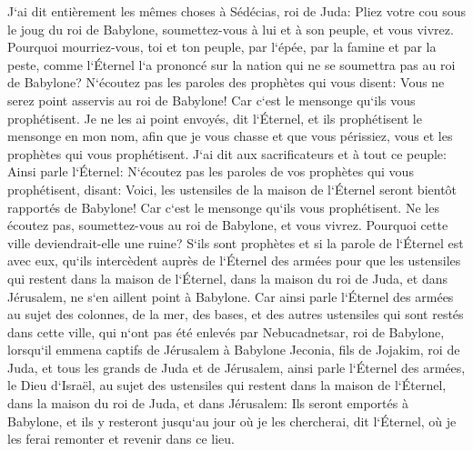 \verse J`ai dit entièrement les mêmes choses à Sédécias, roi de Juda: Pliez votre cou sous le joug du roi de Babylone, soumettez-vous à lui et à son peuple, et vous vivrez. 
\verse Pourquoi mourriez-vous, toi et ton peuple, par l`épée, par la famine et par la peste, comme l`Éternel l`a prononcé sur la nation qui ne se soumettra pas au roi de Babylone? 
\verse N`écoutez pas les paroles des prophètes qui vous disent: Vous ne serez point asservis au roi de Babylone! Car c`est le mensonge qu`ils vous prophétisent. 
\verse Je ne les ai point envoyés, dit l`Éternel, et ils prophétisent le mensonge en mon nom, afin que je vous chasse et que vous périssiez, vous et les prophètes qui vous prophétisent. 
\verse J`ai dit aux sacrificateurs et à tout ce peuple: Ainsi parle l`Éternel: N`écoutez pas les paroles de vos prophètes qui vous prophétisent, disant: Voici, les ustensiles de la maison de l`Éternel seront bientôt rapportés de Babylone! Car c`est le mensonge qu`ils vous prophétisent. 
\verse Ne les écoutez pas, soumettez-vous au roi de Babylone, et vous vivrez. Pourquoi cette ville deviendrait-elle une ruine? 
\verse S`ils sont prophètes et si la parole de l`Éternel est avec eux, qu`ils intercèdent auprès de l`Éternel des armées pour que les ustensiles qui restent dans la maison de l`Éternel, dans la maison du roi de Juda, et dans Jérusalem, ne s`en aillent point à Babylone. 
\verse Car ainsi parle l`Éternel des armées au sujet des colonnes, de la mer, des bases, et des autres ustensiles qui sont restés dans cette ville, 
\verse qui n`ont pas été enlevés par Nebucadnetsar, roi de Babylone, lorsqu`il emmena captifs de Jérusalem à Babylone Jeconia, fils de Jojakim, roi de Juda, et tous les grands de Juda et de Jérusalem, 
\verse ainsi parle l`Éternel des armées, le Dieu d`Israël, au sujet des ustensiles qui restent dans la maison de l`Éternel, dans la maison du roi de Juda, et dans Jérusalem: 
\verse Ils seront emportés à Babylone, et ils y resteront jusqu`au jour où je les chercherai, dit l`Éternel, où je les ferai remonter et revenir dans ce lieu. 

